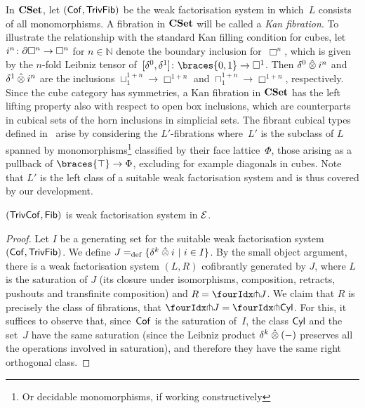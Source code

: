 \documentclass[reqno,10pt,a4paper,oneside,draft]{amsart}
\begin{document}
\begin{example}
In $\CSet$, let $(\Cof, \TrivFib)$ be the weak factorisation system in which~$L$  consists of all monomorphisms.
A  fibration in $\CSet$ will be called a \emph{Kan fibration}.
To illustrate the relationship with the standard Kan filling condition for cubes, let $i^n \co \partial \Box^n \to \Box^n$ for $n \in \mathbb{N}$ denote the boundary inclusion for~$\Box^n$, which is given by the $n$-fold Leibniz tensor of~$[\lcyl, \rcyl] \co \braces{0, 1} \to \Box^1$.
Then $\lcyl \hatotimes i^n$ and $\rcyl \hatotimes i^n$ are the inclusions $\sqcup_1^{1+n} \to \Box^{1+n}$ and $\sqcap_1^{1+n} \to \Box^{1+n}$, respectively.
Since the cube category has symmetries, a Kan fibration in $\CSet$  has the left lifting property also with respect to open box inclusions, which are counterparts in cubical sets of the horn inclusions in simplicial sets.
The fibrant cubical types defined in~\cite{cohen-et-al:cubicaltt} arise by considering the  $L'$-fibrations where~$L'$ is the
subclass of $L$ spanned by monomorphisms\footnote{Or decidable monomorphisms, if working constructively} classified by their face lattice~$\Phi$, \ie those arising as a pullback of $\braces{\top} \to \Phi$, excluding for example diagonals in cubes.
Note that  $L'$ is the left class of a suitable weak factorisation system and is thus covered by our development.
\end{example}

 
\begin{proposition} \label{thm:wfstimes} $(\TrivCof, \Fib)$ is weak factorisation system in $\cal{E}$.
\end{proposition}

\begin{proof} Let $I$ be a generating set for the suitable weak factorisation system $(\Cof, \TrivFib)$.
We  define $J \defeq \{ \delta^k \hatotimes i \ | \ i \in I \}$. By the small object argument, 
there is a weak factorisation system $(L, R)$ cofibrantly generated by $J$, where
$L$ is the saturation of $J$ (\ie its closure under isomorphisms, composition, retracts, pushouts and transfinite composition) 
and $R = \liftr{J}$. 
We claim that $R$ is precisely the class of
fibrations, \ie that $\liftr{J} = \liftr{\Cyl}$. For this, it suffices to observe that, since~$\Cof$ is the saturation of~$I$, the class
$\Cyl$ and the set~$J$ have the same saturation (since the Leibniz product $\kcyl \hatotimes (-)$ preserves all the operations involved in saturation), and therefore they have the same right orthogonal class.
\end{proof}
\end{document}
